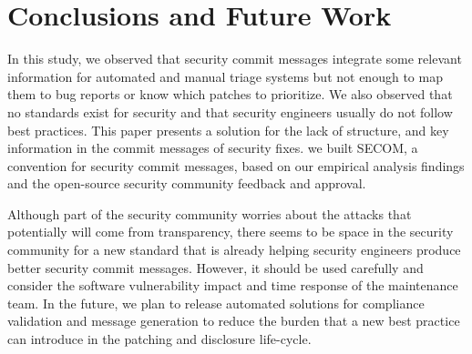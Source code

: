 \section{Conclusions and Future Work}\label{sec:fw}

In this study, we observed that security commit messages integrate some relevant information for automated and manual triage systems but not enough to map them to bug reports or know which patches to prioritize. We also observed that no standards exist for security and that security engineers usually do not follow best practices. This paper presents a solution for 
the lack of structure, and key information in the  
commit messages of security fixes. we built SECOM, a convention for security commit messages, based on our empirical analysis findings and the open-source security community feedback and approval. 

Although part of the security community worries about the attacks that potentially will come from transparency, there seems to be space in the security community for a new standard that is already helping security engineers produce better security commit messages. However, it should be used carefully and consider the software vulnerability impact and time response of the maintenance team. 
%
In the future, we plan to release automated solutions for compliance validation and message generation to reduce the burden that a new best practice can introduce in the patching and disclosure life-cycle. 
